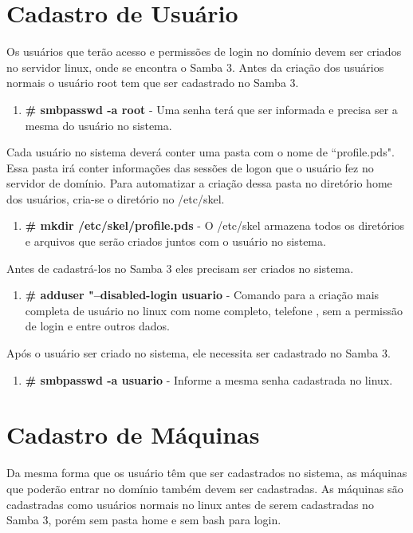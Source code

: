 \section{Cadastro de Usuário}

Os usuários que terão acesso e permissões de login no domínio devem ser criados no servidor linux, onde se encontra o Samba 3. Antes da criação dos usuários normais o usuário root tem que ser cadastrado no Samba 3.

\begin{enumerate}
	\item \textbf {\# smbpasswd -a root} - Uma senha terá que ser informada e precisa ser a mesma do usuário no sistema.
\end{enumerate}

Cada usuário no sistema deverá conter uma pasta com o nome de ``profile.pds". Essa pasta irá conter informações das sessões de logon que o usuário fez no servidor de domínio. Para automatizar a criação dessa pasta no diretório home dos usuários, cria-se o diretório no /etc/skel.

\begin{enumerate}
	\item \textbf{\# mkdir /etc/skel/profile.pds} - O /etc/skel armazena todos os diretórios e arquivos que serão criados juntos com o usuário no sistema.
\end{enumerate}

Antes de cadastrá-los no Samba 3 eles precisam ser criados no sistema.

\begin{enumerate}
	\item \textbf{\# adduser "--disabled-login usuario} - Comando para a criação mais completa de usuário no linux com nome completo, telefone , sem a permissão de login e entre outros dados.
\end{enumerate}

Após o usuário ser criado no sistema, ele necessita ser cadastrado no Samba 3.

\begin{enumerate}
	\item \textbf{\# smbpasswd -a usuario} - Informe a mesma senha cadastrada no linux.
\end{enumerate}

\section{Cadastro de Máquinas}

Da mesma forma que os usuário têm que ser cadastrados no sistema, as máquinas que poderão entrar no domínio também devem ser cadastradas. As máquinas são cadastradas como usuários normais no linux antes de serem cadastradas no Samba 3, porém sem pasta home e sem bash para login.

